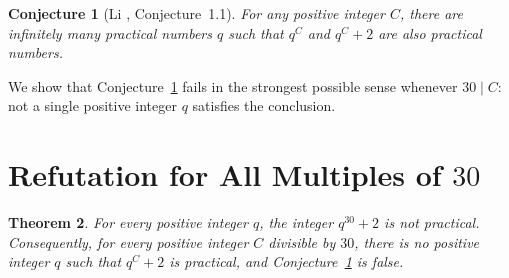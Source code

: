 \documentclass[11pt,a4paper]{article}
\newtheorem{theorem}{Theorem}
\newtheorem{conjecture}[theorem]{Conjecture}
\begin{document}
\begin{conjecture}[Li \cite{Li2026}, Conjecture~1.1]\label{conj:li}
For any positive integer $C$, there are infinitely many practical numbers $q$ such that $q^C$ and $q^C + 2$ are also practical numbers.
\end{conjecture}

We show that Conjecture~\ref{conj:li} fails in the strongest possible sense whenever $30 \mid C$: not a single positive integer $q$ satisfies the conclusion.

\section{Refutation for All Multiples of $30$}

\begin{theorem}\label{thm:main}
For every positive integer $q$, the integer $q^{30} + 2$ is not practical. Consequently, for every positive integer $C$ divisible by $30$, there is no positive integer $q$ such that $q^C + 2$ is practical, and Conjecture~\ref{conj:li} is false.
\end{theorem}
\end{document}
